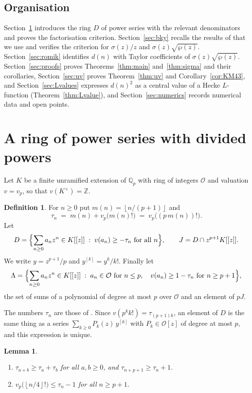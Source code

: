 \documentclass[11pt]{amsart}
\newtheorem{lemma}[theorem]{Lemma}
\theoremstyle{definition}
\newtheorem{definition}[theorem]{Definition}
\theoremstyle{remark}
\newcommand{\Z}{\mathbb{Z}}
\newcommand{\Q}{\mathbb{Q}}
\newcommand{\cO}{\mathcal{O}}
\newcommand{\fl}[1]{\left\lfloor #1 \right\rfloor}
\newcommand{\dpow}[2]{#1^{[#2]}}
\begin{document}
\subsection*{Organisation} Section~\ref{sec:ring} introduces the ring $D$ of power series with the
relevant denominators and proves the factorisation criterion. Section~\ref{sec:bky} recalls the
results of \cite{BKY} that we use and verifies the criterion for $\sigma(z)/z$ and
$\sigma(z)\sqrt{\wp(z)}$. Section~\ref{sec:romik} identifies $d(n)$ with Taylor coefficients of
$\sigma(z)\sqrt{\wp(z)}$. Section~\ref{sec:proofs} proves Theorems~\ref{thm:main} and~\ref{thm:sigma} and their
corollaries, Section~\ref{sec:uv} proves Theorem~\ref{thm:uv} and Corollary~\ref{cor:KM43}, and
Section~\ref{sec:Lvalues} expresses $d(n)^2$ as a central value of a Hecke $L$-function
(Theorem~\ref{thm:Lvalue}), and Section~\ref{sec:numerics} records numerical data and open
points.

\section{A ring of power series with divided powers}\label{sec:ring}

Let $K$ be a finite unramified extension of $\Q_p$ with ring of integers $\cO$ and valuation
$v=v_p$, so that $v(K^\times)=\Z$.

\begin{definition}
For $n\ge0$ put $m(n)=\fl{n/(p+1)}$ and
\[
\tau_n \;=\; m(n)+v_p\bigl(m(n)!\bigr)\;=\;v_p\bigl((p\,m(n))!\bigr).
\]
Let
\[
D=\Bigl\{\sum_{n\ge0}a_nz^n\in K[[z]] \;:\; v(a_n)\ge-\tau_n \text{ for all } n\Bigr\},\qquad
J=D\cap z^{p+1}K[[z]] .
\]
We write $y=z^{p+1}/p$ and $\dpow{y}{k}=y^k/k!$. Finally let
\[
\Lambda=\Bigl\{\sum_{n\ge0}a_nz^n\in K[[z]] \;:\; a_n\in\cO \text{ for } n\le p,\quad
v(a_n)\ge1-\tau_n \text{ for } n\ge p+1\Bigr\},
\]
the set of sums of a polynomial of degree at most $p$ over $\cO$ and an element of $pJ$.
\end{definition}

The numbers $\tau_n$ are those of \cite[(13)]{BKY}. Since $v(p^kk!)=\tau_{(p+1)k}$, an element of
$D$ is the same thing as a series $\sum_{k\ge0}P_k(z)\,\dpow{y}{k}$ with $P_k\in\cO[z]$ of degree at
most $p$, and this expression is unique.

\begin{lemma}\label{lem:tau}
\begin{enumerate}
\item[(a)] $\tau_{a+b}\ge\tau_a+\tau_b$ for all $a,b\ge0$, and $\tau_{n+p+1}\ge\tau_n+1$.
\item[(b)] $v_p\bigl(\fl{n/4}!\bigr)\le\tau_n-1$ for all $n\ge p+1$.
\end{enumerate}
\end{lemma}
\end{document}
